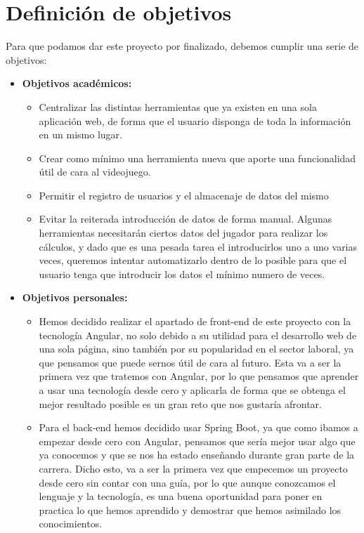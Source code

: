 \chapter{Definici\'on de objetivos}\label{defobjetivos}

Para que podamos dar este proyecto por finalizado, debemos cumplir una serie de objetivos:

\begin{itemize}
	\item \textbf{Objetivos académicos:}
	\begin{itemize}
		\item Centralizar las distintas herramientas que ya existen en una sola aplicación web, de forma que el usuario disponga de toda la información en un mismo lugar.
		
		\item Crear como mínimo una herramienta nueva que aporte una funcionalidad útil de cara al videojuego.
		
		\item Permitir el registro de usuarios y el almacenaje de datos del mismo
		
		\item Evitar la reiterada introducción de datos de forma manual. Algunas herramientas necesitarán ciertos datos del jugador para realizar los cálculos, y dado que es una pesada tarea el introducirlos uno a uno varias veces, queremos intentar automatizarlo dentro de lo posible para que el usuario tenga que introducir los datos el mínimo numero de veces.
	\end{itemize}
	\item \textbf{Objetivos personales:}
	\begin{itemize}
		\item Hemos decidido realizar el apartado de front-end de este proyecto con la tecnología Angular, no solo debido a su utilidad para el desarrollo web de una sola página, sino también por su popularidad en el sector laboral, ya que pensamos que puede sernos útil de cara al futuro. Esta va a ser la primera vez que tratemos con Angular, por lo que pensamos que aprender a usar una tecnología desde cero y aplicarla de forma que se obtenga el mejor resultado posible es un gran reto que nos gustaría afrontar.
		\item Para el back-end hemos decidido usar Spring Boot, ya que como ibamos a empezar desde cero con Angular, pensamos que sería mejor usar algo que ya conocemos y que se nos ha estado enseñando durante gran parte de la carrera. Dicho esto, va a ser la primera vez que empecemos un proyecto desde cero sin contar con una guía, por lo que aunque conozcamos el lenguaje y la tecnología, es una buena oportunidad para poner en practica lo que hemos aprendido y demostrar que hemos asimilado los conocimientos.
	\end{itemize}
\end{itemize}






	